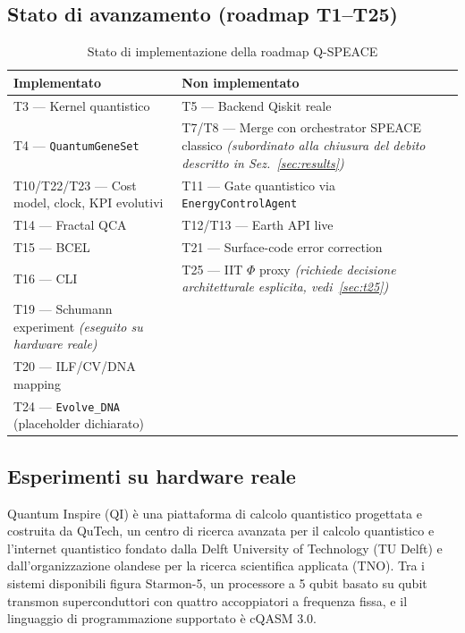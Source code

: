 \documentclass[11pt,a4paper]{article}
\newcommand{\code}[1]{\texttt{#1}}
\newcommand{\starmon}{Starmon-5\xspace}
\begin{document}
\subsection{Stato di avanzamento (roadmap T1--T25)}

\begin{table}[h]
\centering
\caption{Stato di implementazione della roadmap Q-SPEACE}
\label{tab:roadmap}
\begin{tabular}{p{5.5cm}p{5.5cm}}
\toprule
\textbf{Implementato} & \textbf{Non implementato} \\
\midrule
T3 --- Kernel quantistico & T5 --- Backend Qiskit reale \\
T4 --- \code{QuantumGeneSet} & T7/T8 --- Merge con orchestrator SPEACE classico \emph{(subordinato alla chiusura del debito descritto in Sez.~\ref{sec:results})} \\
T10/T22/T23 --- Cost model, clock, KPI evolutivi & T11 --- Gate quantistico via \code{EnergyControlAgent} \\
T14 --- Fractal QCA & T12/T13 --- Earth API live \\
T15 --- BCEL & T21 --- Surface-code error correction \\
T16 --- CLI & T25 --- IIT $\Phi$ proxy \emph{(richiede decisione architetturale esplicita, vedi~\ref{sec:t25})} \\
T19 --- Schumann experiment \emph{(eseguito su hardware reale)} & \\
T20 --- ILF/CV/DNA mapping & \\
T24 --- \code{Evolve\_DNA} (placeholder dichiarato) & \\
\bottomrule
\end{tabular}
\end{table}

\subsection{Esperimenti su hardware reale}
\label{sec:qi-experiments}

Quantum Inspire (QI) \`e una piattaforma di calcolo quantistico progettata e costruita da QuTech, un centro di ricerca avanzata per il calcolo quantistico e l'internet quantistico fondato dalla Delft University of Technology (TU Delft) e dall'organizzazione olandese per la ricerca scientifica applicata (TNO). Tra i sistemi disponibili figura \starmon, un processore a 5 qubit basato su qubit transmon superconduttori con quattro accoppiatori a frequenza fissa, e il linguaggio di programmazione supportato \`e cQASM 3.0.
\end{document}
